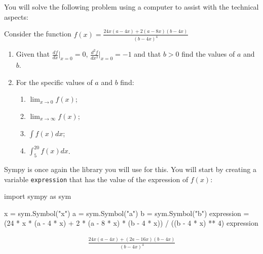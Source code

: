 You will solve the following problem using a computer to assist with the
technical aspects:

Consider the function \(f(x)= \frac{24 x \left(a - 4 x\right) + 2 \left(a - 8 x\right) \left(b - 4 x\right)}{\left(b - 4 x\right)^{4}}\)
\begin{enumerate}

\item 

Given that \(\frac{df}{dx}|_{x=0}=0\), \(\frac{d^2f}{dx^2}|_{x=0}=-1\) and that \(b>0\) find the values of \(a\) and \(b\).

\item 

For the specific values of \(a\) and \(b\) find:
\begin{enumerate}

\item 

\(\lim_{x\to 0}f(x)\);

\item 

\(\lim_{x\to \infty}f(x)\);

\item 

\(\int f(x) dx\);

\item 

\(\int_{5}^{20} f(x) dx\).

\end{enumerate}

\end{enumerate}



Sympy is once again the library you will use for this.
You will start by creating a variable \texttt{expression} that has the value of the expression of \(f(x)\):




\begin{pyin}
import sympy as sym

x = sym.Symbol("x")
a = sym.Symbol("a")
b = sym.Symbol("b")
expression = (24 * x * (a - 4 * x) + 2 * (a - 8 * x) * (b - 4 * x)) / ((b - 4 * x) ** 4)
expression
\end{pyin}




\begin{equation*}
\begin{split}\displaystyle \frac{24 x \left(a - 4 x\right) + \left(2 a - 16 x\right) \left(b - 4 x\right)}{\left(b - 4 x\right)^{4}}\end{split}
\end{equation*}

